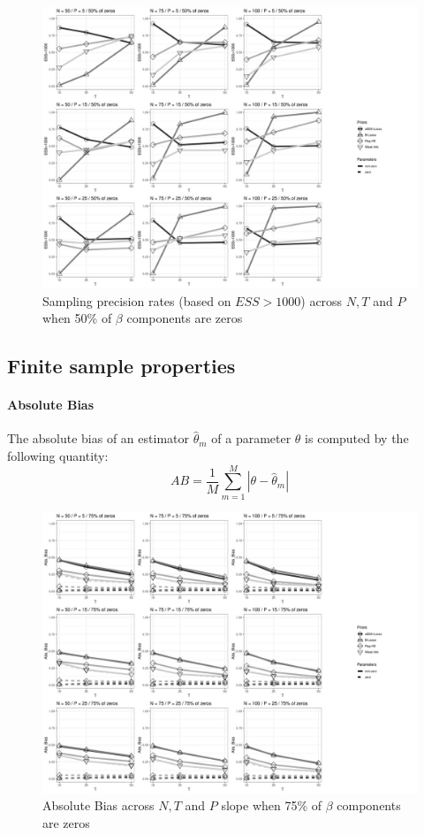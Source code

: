 \documentclass[a4paper,12pt]{article}
\begin{document}
\begin{figure}[]
\centering 
\includegraphics[width=18cm]{Prec1000_nz50_beta.jpg}
\caption{Sampling precision rates (based on $ESS>1000$) across $N, T$ and $P$ when 50\% of $\beta$ components are zeros}
\label{fig:Prec1000_nz50}
\end{figure}

\clearpage
\subsection{Finite sample properties}
\paragraph{Absolute Bias}
The absolute bias of an estimator $\hat{\theta}_m$ of a parameter $\theta$ is computed by the following  quantity:
\[  AB = \frac{1}{M} \sum_{m=1}^{M}|\theta-\hat{\theta}_m| \]

\begin{figure}[h]\label{fig:ABias_nz25}
\centering 
\includegraphics[width=18cm]{Abs_Bias_nz25_beta.jpg}
\caption{Absolute Bias across $N, T$ and $P$ slope when 75\% of $\beta$ components are zeros}
\end{figure}
\end{document}
